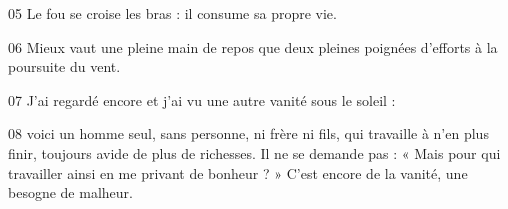 
05 Le fou se croise les bras : il consume sa propre vie.

06 Mieux vaut une pleine main de repos que deux pleines poignées d’efforts à la poursuite du vent.

07 J’ai regardé encore et j’ai vu une autre vanité sous le soleil :

08 voici un homme seul, sans personne, ni frère ni fils, qui travaille à n’en plus finir, toujours avide de plus de richesses. Il ne se demande pas : « Mais pour qui travailler ainsi en me privant de bonheur ? » C’est encore de la vanité, une besogne de malheur.
